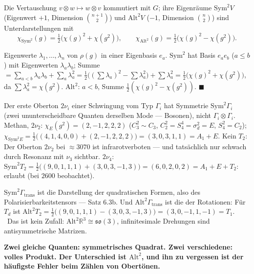 \begin{merksatz}
Die Vertauschung $v\otimes w\mapsto w\otimes v$ kommutiert mit $G$; ihre Eigenräume $\mathrm{Sym}^{2}V$ (Eigenwert $+1$, Dimension $\binom{n+1}2$) und $\mathrm{Alt}^{2}V$ ($-1$, Dimension $\binom n2$) sind Unterdarstellungen mit
\[ \chi_{\mathrm{Sym}^{2}}(g) = \tfrac12\bigl(\chi(g)^{2} + \chi(g^{2})\bigr),\qquad\chi_{\mathrm{Alt}^{2}}(g) = \tfrac12\bigl(\chi(g)^{2} - \chi(g^{2})\bigr) . \]

Eigenwerte $\lambda_1, \dots, \lambda_n$ von $\rho(g)$ in einer Eigenbasis $e_a$. $\mathrm{Sym}^{2}$ hat Basis $e_ae_b$ ($a\le b$) mit Eigenwerten $\lambda_a\lambda_b$; Summe $= \sum_{a<b}\lambda_a\lambda_b + \sum_a\lambda_a^{2} = \frac12\bigl((\sum\lambda_a)^{2} - \sum\lambda_a^{2}\bigr) + \sum\lambda_a^{2} = \frac12\bigl(\chi(g)^{2} + \chi(g^{2})\bigr)$, da $\sum\lambda_a^{2} = \chi(g^{2})$. $\mathrm{Alt}^{2}$: $a < b$, Summe $\frac12(\chi(g)^{2} - \chi(g^{2}))$. $\blacksquare$

Der erste Oberton $2\nu_i$ einer Schwingung vom Typ $\Gamma_i$ hat Symmetrie $\mathrm{Sym}^{2}\Gamma_i$ (zwei ununterscheidbare Quanten derselben Mode --- Bosonen), nicht $\Gamma_i\otimes\Gamma_i$. Methan, $2\nu_2$: $\chi_E(g^{2}) = (2, -1, 2, 2, 2)$ ($C_3^{2}\sim C_3$, $C_2^{2} = S_4^{4} = \sigma_d^{2} = E$, $S_4^{2} = C_2$); $\chi_{\mathrm{Sym}^{2}E} = \frac12\bigl((4, 1, 4, 0, 0) + (2, -1, 2, 2, 2)\bigr) = (3, 0, 3, 1, 1) = A_1 + E$. Kein $T_2$: Der Oberton $2\nu_2$ bei $\approx3070$ ist infrarotverboten --- und tatsächlich nur schwach durch Resonanz mit $\nu_3$ sichtbar. $2\nu_4$: $\mathrm{Sym}^{2}T_2 = \frac12\bigl((9, 0, 1, 1, 1) + (3, 0, 3, -1, 3)\bigr) = (6, 0, 2, 0, 2) = A_1 + E + T_2$: erlaubt (bei $2600$ beobachtet).

$\mathrm{Sym}^{2}\Gamma_{\mathrm{trans}}$ ist die Darstellung der quadratischen Formen, also des Polarisierbarkeitstensors --- Satz 6.3b. Und $\mathrm{Alt}^{2}\Gamma_{\mathrm{trans}}$ ist die der Rotationen: Für $T_d$ ist $\mathrm{Alt}^{2}T_2 = \frac12\bigl((9, 0, 1, 1, 1) - (3, 0, 3, -1, 3)\bigr) = (3, 0, -1, 1, -1) = T_1$. \checkmark\ Das ist kein Zufall: $\mathrm{Alt}^{2}\mathbb R^{3}\cong\mathfrak{so}(3)$, infinitesimale Drehungen sind antisymmetrische Matrizen.

\begin{center}
\begin{minipage}{0.9\textwidth}
\textbf{Zwei gleiche Quanten: symmetrisches Quadrat. Zwei verschiedene: volles Produkt. Der Unterschied ist $\mathrm{Alt}^{2}$, und ihn zu vergessen ist der häufigste Fehler beim Zählen von Obertönen.}
\end{minipage}
\end{center}
\end{merksatz}

